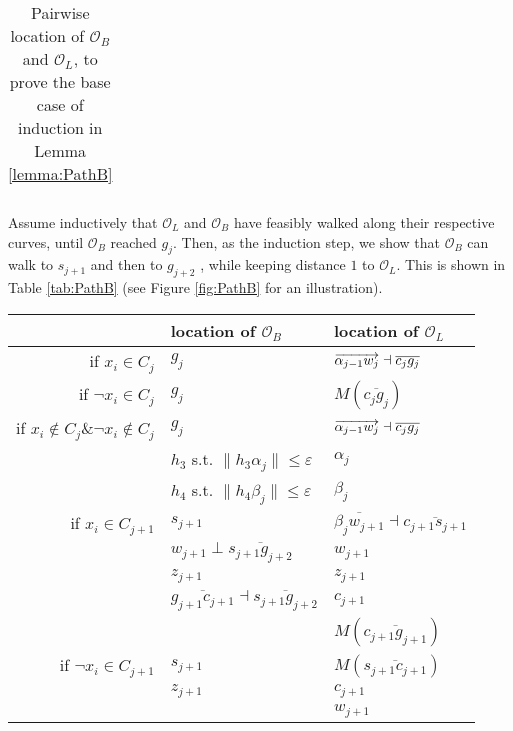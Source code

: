 \documentclass[12pt]{dalthesis}
\def\favoritefont{\bfseries \sffamily}
\def\QED{\ensuremath{{\Box}}}
\def\markatright#1{\leavevmode\unskip\nobreak\quad\hspace*{\fill}{#1}}
\newenvironment{proof}
	{\begin{trivlist}\item[\hskip\labelsep{\favoritefont Proof:}]}
	{\markatright{\QED}\end{trivlist}}
\newcommand{\eps}{\varepsilon}
\newcommand{\CO}{{\mathscr O}}
\newcommand{\Seg}[1]{{\overline{#1}}}
\begin{document}
\begin{proof}
\begin{table}[h]
\begin{tabular}{ r | l | l  }
\end{tabular}
\vspace{0.2 in}
\caption{Pairwise location of $\CO_B$ and $\CO_L$, to prove the base case of induction in Lemma \ref{lemma:PathB} }
\label{tab:BaseCasePathB}
\end{table}





Assume inductively that $\CO_L$ and $\CO_B$ have feasibly walked along 
their respective curves, until $\CO_B$ reached $g_j$.
Then, as the induction step, 
we 
show that
$\CO_B$ can walk to $s_{j+1}$ and then to $g_{j+2}$ 
, while keeping distance $1$ to $\CO_L$.
This is shown in Table \ref{tab:PathB}
 (see Figure \ref{fig:PathB} for an illustration). 


\begin{table}[h]
\centering
\begin{tabular}{ r | l | l  }
  & location of $\CO_B$ & location of $\CO_L$  
 \\
\hline
   if $x_i \in C_j$  & $g_j$ & $\Dir{\alpha_{j-1}w_j} 	\dashv \Seg{c_jg_j}$ \\
   if $\neg x_i \in C_j$  & $g_j$ & $M(\Seg{c_jg_j})$\\
   if $x_i \notin C_j \& \neg x_i \notin C_j$  & $g_j$ & $\Dir{\alpha_{j-1}w_j}	\dashv \Seg{c_jg_j}$\\

\hline
	&  $h_3$ s.t.  $\| h_3\alpha_j \| \le \eps$ & $\alpha_j$\\
	&  	$h_4$ s.t.  $\| h_4 \beta_j \| \le \eps$ & $\beta_j$\\

\hline
if $x_i \in C_{j+1}$ &  				 $s_{j+1}$  & $\Seg{\beta_jw_{j+1}}	\dashv \Seg{c_{j+1}s_{j+1}}$\\
& $w_{j+1} \perp \Seg{s_{j+1}g_{j+2}}$ & $w_{j+1}$\\
& $z_{j+1}$ & $z_{j+1}$\\

&  $\Seg{g_{j+1}c_{j+1}}	\dashv \Seg{s_{j+1}g_{j+2}}$ & $c_{j+1}$ \\
&  & $M(\Seg{c_{j+1}g_{j+1}})$
 \\




if $\neg x_i \in C_{j+1}$ &  				 $s_{j+1}$  & $M(\Seg{s_{j+1}c_{j+1}})$\\

 & $z_{j+1}$ & $c_{j+1}$ \\
 &  & $w_{j+1}$ \\



\end{tabular}
\end{table}
\end{proof}
\end{document}
